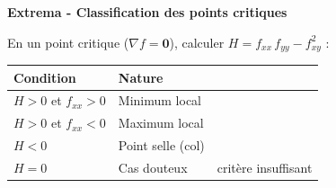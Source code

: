 \documentclass[11pt,a4paper]{article}
\begin{document}
\begin{methodebox}
\textbf{Extrema - Classification des points critiques}

En un point critique ($\nabla f = \mathbf{0}$), calculer $H = f_{xx}\,f_{yy} - f_{xy}^2$ :
\begin{center}
\begin{tabular}{@{}lll@{}}
\toprule
Condition & Nature & \\
\midrule
$H > 0$ et $f_{xx} > 0$ & Minimum local    & \\
$H > 0$ et $f_{xx} < 0$ & Maximum local    & \\
$H < 0$                 & Point selle (col) & \\
$H = 0$                 & Cas douteux       & critère insuffisant \\
\bottomrule
\end{tabular}
\end{center}
\end{methodebox}
\end{document}
